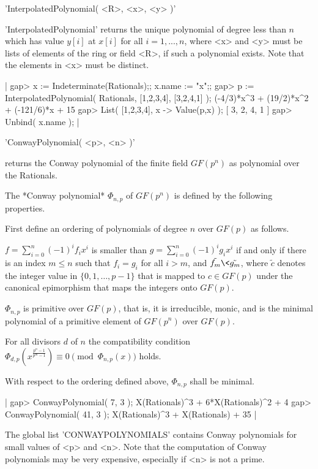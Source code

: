 
'InterpolatedPolynomial( <R>, <x>, <y> )'

'InterpolatedPolynomial'  returns the unique   polynomial of  degree less
than $n$ which has value $y[i]$ at $x[i]$ for  all $i=1,...,n$, where <x>
and <y> must  be lists of elements  of the ring or  field <R>, if such  a
polynomial exists.  Note that the elements in <x> must be distinct.

|    gap> x := Indeterminate(Rationals);; x.name := "x";;
    gap> p := InterpolatedPolynomial( Rationals, [1,2,3,4], [3,2,4,1] );
    (-4/3)*x^3 + (19/2)*x^2 + (-121/6)*x + 15
    gap> List( [1,2,3,4], x -> Value(p,x) );
    [ 3, 2, 4, 1 ] 
    gap> Unbind( x.name ); |


'ConwayPolynomial( <p>, <n> )'

returns the Conway polynomial of the finite field $GF(p^n)$ as
polynomial over the Rationals.

The *Conway polynomial* $\Phi_{n,p}$ of $GF(p^n)$ is defined by the
following properties.

First define an ordering of polynomials of degree $n$ over $GF(p)$ as
follows.

$f = \sum_{i=0}^n (-1)^i f_i x^i$ is smaller than
$g = \sum_{i=0}^n (-1)^i g_i x^i$ if and only if there is an index
$m \leq n$ such that $f_i = g_i$ for all $i > m$, and
$\tilde{f_m} \< \tilde{g_m}$, where $\tilde{c}$ denotes the integer
value in $\{ 0, 1, \ldots, p-1 \}$ that is mapped to $c\in GF(p)$ under
the canonical epimorphism that maps the integers onto $GF(p)$.

$\Phi_{n,p}$ is primitive over $GF(p)$, that is, it is irreducible,
monic, and is the minimal polynomial of a primitive element of
$GF(p^n)$ over $GF(p)$.

For all divisors $d$ of $n$ the compatibility condition
$\Phi_{d,p}( x^{\frac{p^n-1}{p^m-1}} ) \equiv 0 \pmod{\Phi_{n,p}(x)}$
holds.

With respect to the ordering defined above, $\Phi_{n,p}$ shall be
minimal.

|    gap> ConwayPolynomial( 7, 3 );
    X(Rationals)^3 + 6*X(Rationals)^2 + 4
    gap> ConwayPolynomial( 41, 3 );
    X(Rationals)^3 + X(Rationals) + 35 |

The global list 'CONWAYPOLYNOMIALS' contains Conway polynomials for small
values of <p> and <n>.
Note that the computation of Conway polynomials may be very expensive,
especially if <n> is not a prime.

